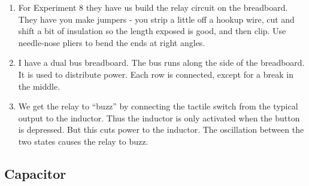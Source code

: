 \documentclass[11pt, oneside]{amsart}
\begin{document}
\begin{enumerate}
  \item For Experiment 8 they have us build the relay circuit on the
  breadboard. They have you make jumpers - you strip a little off a
  hookup wire, cut and shift a bit of insulation so the length exposed
  is good, and then clip. Use needle-nose pliers to bend the ends at
  right angles.

  \item I have a dual bus breadboard. The bus runs along the side of the
  breadboard. It is used to distribute power. Each row is connected,
  except for a break in the middle.

  \item We get the relay to ``buzz'' by connecting the tactile switch
  from the typical output to the inductor. Thus the inductor is only
  activated when the button is depressed. But this cuts power to the
  inductor. The oscillation between the two states causes the relay to
  buzz.
\end{enumerate}

\subsection{Capacitor}
\end{document}
